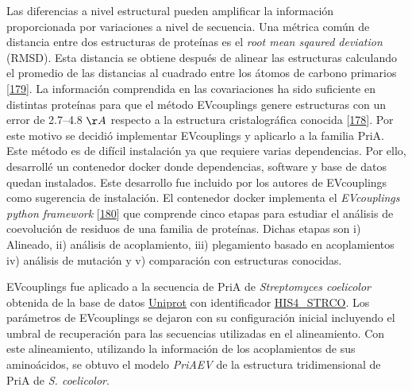 \documentclass[12pt,twoside]{reedthesis}
\begin{document}
  Las diferencias a nivel estructural pueden amplificar la información
  proporcionada por variaciones a nivel de secuencia. Una métrica común de
  distancia entre dos estructuras de proteínas es el \emph{root mean
  sqaured deviation} (RMSD). Esta distancia se obtiene después de alinear
  las estructuras calculando el promedio de las distancias al cuadrado
  entre los átomos de carbono primarios
  {[}\protect\hyperlink{ref-kufareva_methods_2012}{179}{]}. La información
  comprendida en las covariaciones ha sido suficiente en distintas
  proteínas para que el método EVcouplings genere estructuras con un error
  de 2.7--4.8 \({\AA}\) respecto a la estructura cristalográfica conocida
  {[}\protect\hyperlink{ref-marks_protein_2011}{178}{]}. Por este motivo
  se decidió implementar EVcouplings y aplicarlo a la familia PriA. Este
  método es de difícil instalación ya que requiere varias dependencias.
  Por ello, desarrollé un contenedor docker donde dependencias, software y
  base de datos quedan instalados. Este desarrollo fue incluido por los
  autores de EVcouplings como sugerencia de instalación. El contenedor
  docker implementa el \emph{EVcouplings python framework}
  {[}\protect\hyperlink{ref-hopf_evcouplings_2019}{180}{]} que comprende
  cinco etapas para estudiar el análisis de coevolución de residuos de una
  familia de proteínas. Dichas etapas son i) Alineado, ii) análisis de
  acoplamiento, iii) plegamiento basado en acoplamientos iv) análisis de
  mutación y v) comparación con estructuras conocidas.
  
  EVcouplings fue aplicado a la secuencia de PriA de \emph{Streptomyces
  coelicolor} obtenida de la base de datos
  \href{https://www.uniprot.org/}{Uniprot} con identificador
  \href{https://www.uniprot.org/uniprot/P16250}{HIS4\_STRCO}. Los
  parámetros de EVcouplings se dejaron con su configuración inicial
  incluyendo el umbral de recuperación para las secuencias utilizadas en
  el alineamiento. Con este alineamiento, utilizando la información de los
  acoplamientos de sus aminoácidos, se obtuvo el modelo \emph{PriAEV} de
  la estructura tridimensional de PriA de \emph{S. coelicolor}.
  
\end{document}

